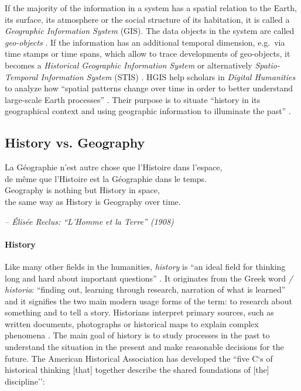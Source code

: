 If the majority of the information in a system has a spatial relation to the Earth, its surface, its atmosphere or the social structure of its habitation, it is called a \emph{Geographic Information System} (GIS). The data objects in the system are called \emph{geo-objects}
\cite{bolstad2008gis}.
If the information has an additional temporal dimension, e.g.\ via time stamps or time spans, which allow to trace developments of geo-objects, it becomes a \emph{Historical Geographic Information System}
\cite{gregory2014toward}
or alternatively \emph{Spatio-Temporal Information System} (STIS)
\cite{pelekis04stdms}.
HGIS help scholars in \emph{Digital Humanities} to analyze how ``spatial patterns change over time in order to better understand large-scale Earth processes''
\cite{peuquet99}.
Their purpose is to situate ``history in its geographical context and using geographic information to illuminate the past''
\cite{knowles2008placing}.

\subsection{History vs. Geography} %
\label{sub:history_vs_geography}

\begin{quoteit}
La Géographie n’est autre chose que l’Histoire dans l’espace, \\
de même que l’Histoire est la Géographie dans le temps. \\[1.0em]
Geography is nothing but History in space, \\
the same way as History is Geography over time.
\end{quoteit}
\hfill \textit{-- Élisée Reclus: ``L'Homme et la Terre'' (1908)}

\paragraph{History} %
\label{par:history}

Like many other fields in the humanities, \emph{history} is ``an ideal field for thinking long and hard about important questions''
\cite{ahaFiveCs}.
It originates from the Greek word \emph{\textIota\textsigma\texttau\textomikron\textrho\textiota\textalpha / historia}: ``finding out, learning through research, narration of what is learned'' \cite{dict}
and it signifies the two main modern usage forms of the term: to research about something and to tell a story. Historians interpret primary sources, such as written documents, photographs or historical maps to explain complex phenomena \cite[pp.4-7]{knowles2008placing}. The main goal of history is to study processes in the past to understand the situation in the present and make reasonable decisions for the future. The American Historical Association has developed the ``five C`s of historical thinking [that] together describe the shared foundations of [the] discipline''\cite{ahaFiveCs}:

